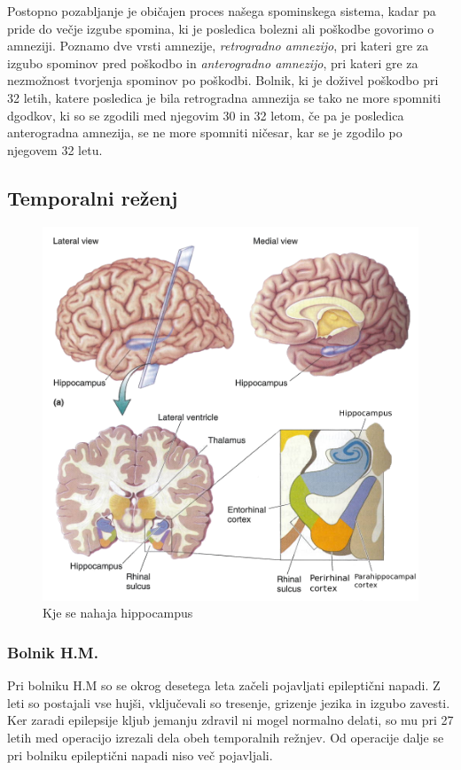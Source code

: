 \documentclass[10pt,a4paper]{article}
\begin{document}
Postopno pozabljanje je običajen proces našega spominskega sistema, kadar pa pride do večje izgube spomina, ki je posledica bolezni ali poškodbe govorimo o amneziji. Poznamo dve vrsti amnezije, {\it retrogradno amnezijo}, pri kateri gre za izgubo spominov pred poškodbo in {\it anterogradno amnezijo}, pri kateri gre za nezmožnost tvorjenja spominov po poškodbi. Bolnik, ki je doživel poškodbo pri 32 letih, katere posledica je bila retrogradna amnezija se tako ne more spomniti dgodkov, ki so se zgodili med njegovim 30 in 32 letom, če pa je posledica anterogradna amnezija, se ne more spomniti ničesar, kar se je zgodilo po njegovem 32 letu.

\subsection{Temporalni reženj}
\begin{figure}[h]
  \centering
    \includegraphics[width=1.0\textwidth]{LokacijaHippocampusa.png}
  \caption{Kje se nahaja hippocampus}
  \label{sHippocampus}
\end{figure}

\subsubsection{Bolnik H.M.}
Pri bolniku H.M so se okrog desetega leta začeli pojavljati epileptični napadi. Z leti so postajali vse hujši, vključevali so tresenje, grizenje jezika in izgubo zavesti. Ker zaradi epilepsije kljub jemanju zdravil ni mogel normalno delati, so mu pri 27 letih med operacijo izrezali dela obeh temporalnih režnjev. Od operacije dalje se pri bolniku epileptični napadi niso več pojavljali.
\end{document}
